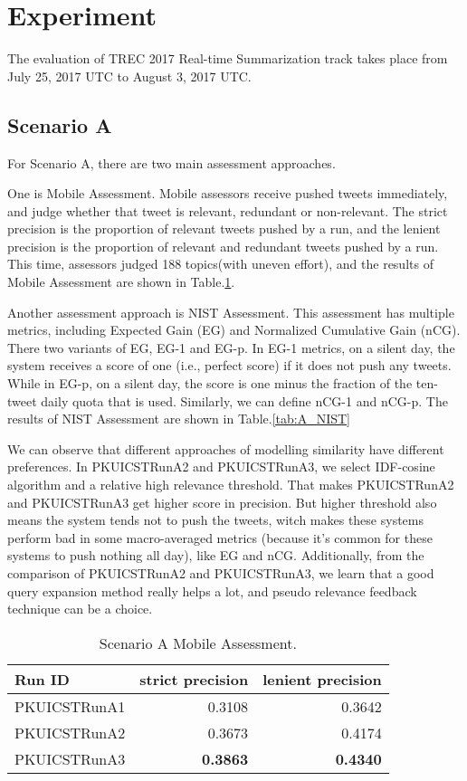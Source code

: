 \section{Experiment}
The evaluation of TREC 2017 Real-time Summarization track takes place from
July 25, 2017 UTC to August 3, 2017 UTC.

\subsection{Scenario A}
For Scenario A, there are two main assessment approaches.

One is Mobile Assessment. Mobile assessors receive pushed tweets immediately, 
and judge whether that tweet is relevant, redundant or non-relevant.
The strict precision is the proportion of relevant tweets pushed by a run,
and the lenient precision is the proportion of relevant and redundant tweets pushed by a run.
This time, assessors judged 188 topics(with uneven effort), 
and the results of Mobile Assessment are shown in Table.\ref{tab:A_mobile}.

Another assessment approach is NIST Assessment. 
This assessment has multiple metrics, 
including Expected Gain (EG) and Normalized Cumulative Gain (nCG).
There two variants of EG, EG-1 and EG-p.
In EG-1 metrics, on a silent day,  
the system receives a score of one (i.e., perfect score) if it does not push any tweets.
While in EG-p, on a silent day, 
the score is one minus the fraction of the ten-tweet daily quota that is used. 
Similarly, we can define nCG-1 and nCG-p.
The results of NIST Assessment are shown in Table.\ref{tab:A_NIST}

We can observe that different approaches of modelling similarity have different preferences.
In PKUICSTRunA2 and PKUICSTRunA3, we select IDF-cosine algorithm and a relative high relevance threshold.
That makes PKUICSTRunA2 and PKUICSTRunA3 get higher score in precision.
But higher threshold also means the system tends not to push the tweets, 
witch makes these systems perform bad in some macro-averaged metrics
(because it's common for these systems to push nothing all day), like EG and nCG.
Additionally, from the comparison of PKUICSTRunA2 and PKUICSTRunA3, 
we learn that a good query expansion method really helps a lot,
and pseudo relevance feedback technique can be a choice.     

\begin{table}[htbp]
\centering
\caption{Scenario A Mobile Assessment.}
\label{tab:A_mobile}
\begin{tabular}{lrr}
\hline
Run ID&strict precision&lenient precision\\
\hline
PKUICSTRunA1&0.3108&0.3642\\
PKUICSTRunA2&0.3673&0.4174\\
PKUICSTRunA3&\textbf{0.3863}&\textbf{0.4340}\\
\hline
\end{tabular}
\end{table}

